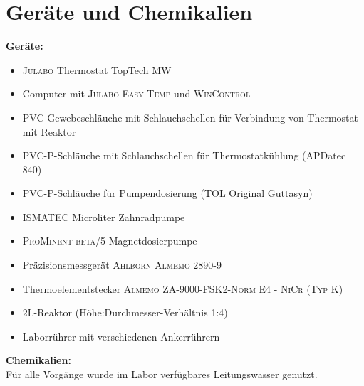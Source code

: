 \section{Geräte und Chemikalien}
\label{sec:geraete}

\textbf{Geräte:}
\begin{itemize}
	\item \textsc{Julabo} Thermostat TopTech MW
	\item Computer mit \textsc{Julabo Easy Temp} und \textsc{WinControl}
	\item PVC-Gewebeschläuche mit Schlauchschellen für Verbindung von Thermostat mit Reaktor
	\item PVC-P-Schläuche mit Schlauchschellen für Thermostatkühlung (APDatec 840) 
	\item PVC-P-Schläuche für Pumpendosierung (TOL Original Guttasyn)
	\item \textsc{ISMATEC} Microliter Zahnradpumpe
	\item \textsc{ProMinent beta/5} Magnetdosierpumpe 
	\item Präzisionsmessgerät \textsc{Ahlborn Almemo 2890-9}
	\item Thermoelementstecker \textsc{Almemo ZA-9000-FSK2-Norm E4 - NiCr (Typ K)}
	\item 2L-Reaktor (Höhe:Durchmesser-Verhältnis 1:4)
	\item Laborrührer mit verschiedenen Ankerrührern
\end{itemize}

\textbf{Chemikalien:}\\
Für alle Vorgänge wurde im Labor verfügbares Leitungswasser genutzt.